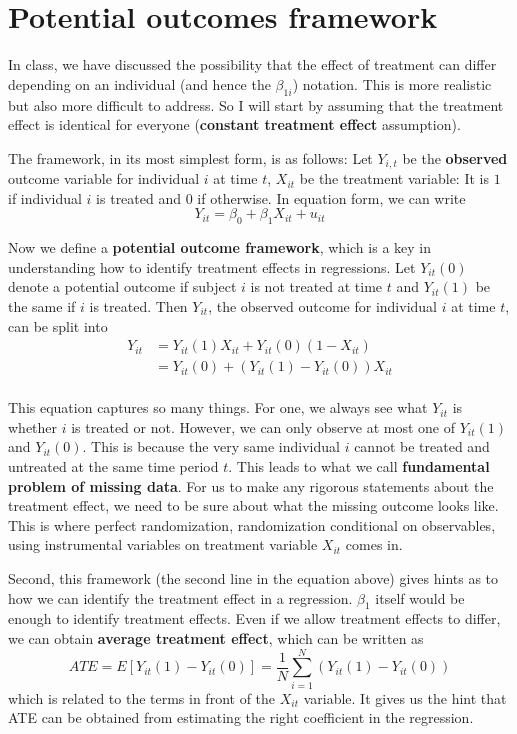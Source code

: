 \begin{mdframed}[backgroundcolor =blue!10]
\begin{itemize}
\end{itemize}
\end{mdframed} \par\medskip

\section{Potential outcomes framework}
In class, we have discussed the possibility that the effect of treatment can differ depending on an individual (and hence the $\beta_{1i}$) notation. This is more realistic but also more difficult to address. So I will start by assuming that the treatment effect is identical for everyone (\textbf{constant treatment effect} assumption).\par\medskip
The framework, in its most simplest form, is as follows: Let $Y_{i,t}$ be the \textbf{observed} outcome variable for individual $i$ at time $t$, $X_{it}$ be the treatment variable: It is $1$ if individual $i$ is treated and $0$ if otherwise. In equation form, we can write
\[
Y_{it}=\beta_0+\beta_1X_{it}+u_{it}
\]
\par\medskip
Now we define a \textbf{potential outcome framework}, which is a key in understanding how to identify treatment effects in regressions.  Let $Y_{it}(0)$ denote a potential outcome if subject $i$ is not treated at time $t$ and $Y_{it}(1)$ be the same if $i$ is treated. Then $Y_{it}$, the observed outcome for individual $i$ at time $t$, can be split into
\[
\begin{aligned}
Y_{it} & = Y_{it}(1)X_{it}+Y_{it}(0)(1-X_{it})\\
&=Y_{it}(0)+(Y_{it}(1)-Y_{it}(0))X_{it} \\
\end{aligned}
\] 
\par\medskip
This equation captures so many things. For one, we always see what $Y_{it}$ is whether $i$ is treated or not. However, we can only observe at most one of $Y_{it}(1)$ and $Y_{it}(0)$. This is because the very same individual $i$ cannot be treated and untreated at the same time period $t$. This leads to what we call \textbf{fundamental problem of missing data}. For us to make any rigorous statements about the treatment effect, we need to be sure about what the missing outcome looks like. This is where perfect randomization, randomization conditional on observables, using instrumental variables on treatment variable $X_{it}$ comes in.
\par\medskip
Second, this framework (the second line in the equation above) gives hints as to how we can identify the treatment effect in a regression. $\beta_1$ itself would be enough to identify treatment effects. Even if we allow treatment effects to differ, we can obtain \textbf{average treatment effect}, which can be written as
\[
ATE = E[Y_{it}(1)-Y_{it}(0)]=\frac{1}{N}\sum_{i=1}^N(Y_{it}(1)-Y_{it}(0))
\]
which is related to the terms in front of the $X_{it}$ variable. It gives us the hint that ATE can be obtained from estimating the right coefficient in the regression. 
